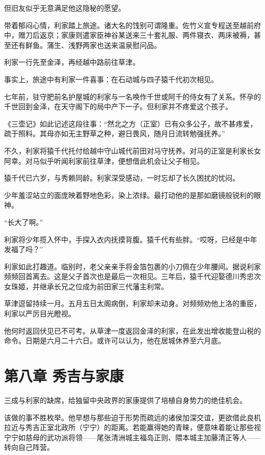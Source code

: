 \documentclass[
]{book}
\begin{document}
但旧友似乎无意满足他这隐秘的愿望。

带着郁闷心情，利家踏上旅途。诸大名的饯别可谓隆重。佐竹义宣专程送至越前府中，赠刀后返京；家康则遣家臣神谷某送来三十套礼服、两件寝衣、两床被褥，甚至还有鲜鱼。蒲生、浅野两家也送来温泉慰问品。

利家一行先至金泽，再经越中路前往草津。

事实上，旅途中有利家一件喜事：在石动城与四子猿千代初次相见。

七年前，驻守肥前名护屋城的利家与一名唤作千世或阿千的侍女有了关系。怀孕的千世回到金泽，在天守阁下的局中产下一子。但利家并不疼爱这个孩子。

《三壶记》如此记述这段往事：``然北之方（正室）已有众多公子，故不甚疼爱，疏于照料。其母亦如无主野草之种，避日畏风，随月日流转勉强抚养。''

不久，利家将猿千代托付给越中守山城代前田对马守抚养。对马的正室是利家长女阿幸。对马似乎听闻利家前往草津，便想借此机会让父子相见。

猿千代已六岁，与秀赖同龄。利家深受感动，一时忘却了长久困扰的忧闷。

少年羞涩站立的面庞映着野地色彩，染上浓绿。最打动他的是那如磨镜般锐利的眼神。

``长大了啊。''

利家将少年揽入怀中，手探入衣内抚摸背腹。猿千代有些胖。``哎呀，已经是中年发福了吗？''

利家如此打趣道。临别时，老父亲亲手将金箔包裹的小刀佩在少年腰间。据说利家频频回首离去。这是父子首次也是最后一次相见。三年后，猿千代迎娶德川秀忠次女珠姬，并继承长兄之位成为前田家三代藩主利常。

草津逗留持续一月。五月五日太阁病倒，利家却未动身。对频频劝他上洛的重臣，利家以严厉目光瞪视。

他何时返回伏见已不可考。从草津一度返回金泽的利家，在此发出增收能登山税的命令。日期是六月二十六日。或许可以认为，他在居城休养至六月底。

\chapter*{第八章 秀吉与家康}\label{ux7b2cux516bux7ae0-ux79c0ux5409ux4e0eux5bb6ux5eb7}

三成与利家的缺席，给独留中央政界的家康提供了培植自身势力的绝佳机会。

该做的事不胜枚举。他早想与那些迫于形势而疏远的诸侯加深交谊，更欲借此良机拉近与秀吉正室北政所（宁宁）的距离。若能赢得她的青睐，便意味着能让那些视宁宁如慈母的武功派将领------尾张清洲城主福岛正则、隈本城主加藤清正等人------转向自己阵营。
\end{document}
